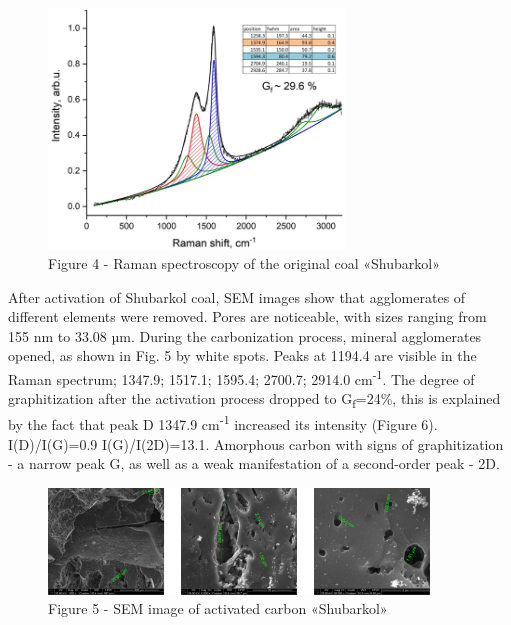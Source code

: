 \begin{figure}[H]
	\centering
	\includegraphics[width=0.7\textwidth]{assets/56}
	\caption*{Figure 4 - Raman spectroscopy of the original coal «Shubarkol»}
\end{figure}

\begin{multicols}{2}
After activation of Shubarkol coal, SEM images show that agglomerates of
different elements were removed. Pores are noticeable, with sizes
ranging from 155 nm to 33.08 µm. During the carbonization process,
mineral agglomerates opened, as shown in Fig. 5 by white spots. Peaks at
1194.4 are visible in the Raman spectrum; 1347.9; 1517.1; 1595.4;
2700.7; 2914.0 cm\textsuperscript{-1}. The degree of graphitization
after the activation process dropped to G\textsubscript{f}=24\%, this is
explained by the fact that peak D 1347.9 cm\textsuperscript{-1}
increased its intensity (Figure 6). I(D)/I(G)=0.9 I(G)/I(2D)=13.1.
Amorphous carbon with signs of graphitization - a narrow peak G, as well
as a weak manifestation of a second-order peak - 2D.
\end{multicols}

\begin{figure}[H]
	\centering
	\includegraphics[width=0.9\textwidth]{assets/57}
	\caption*{Figure 5 - SEM image of activated carbon «Shubarkol»}
\end{figure}

